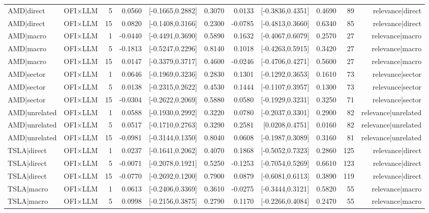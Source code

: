 \begin{table}[htbp]
\begin{tabular}{lrrrrrrrrrr}
AMD|direct & OFI×LLM & 5 & 0.0560 & [-0.1665,0.2882] & 0.3070 & 0.0133 & [-0.3836,0.4351] & 0.4690 & 89 & relevance|direct \\
AMD|direct & OFI×LLM & 15 & 0.0820 & [-0.1408,0.3166] & 0.2300 & -0.0785 & [-0.4813,0.3660] & 0.6340 & 85 & relevance|direct \\
AMD|macro & OFI×LLM & 1 & -0.0440 & [-0.4491,0.3690] & 0.5890 & 0.1632 & [-0.4067,0.6079] & 0.2570 & 27 & relevance|macro \\
AMD|macro & OFI×LLM & 5 & -0.1813 & [-0.5247,0.2296] & 0.8140 & 0.1018 & [-0.4263,0.5915] & 0.3420 & 27 & relevance|macro \\
AMD|macro & OFI×LLM & 15 & 0.0147 & [-0.3379,0.3717] & 0.4600 & -0.0246 & [-0.4706,0.4271] & 0.5600 & 27 & relevance|macro \\
AMD|sector & OFI×LLM & 1 & 0.0646 & [-0.1969,0.3236] & 0.2830 & 0.1301 & [-0.1292,0.3653] & 0.1610 & 73 & relevance|sector \\
AMD|sector & OFI×LLM & 5 & 0.0138 & [-0.2315,0.2622] & 0.4530 & 0.1444 & [-0.1107,0.3957] & 0.1300 & 73 & relevance|sector \\
AMD|sector & OFI×LLM & 15 & -0.0304 & [-0.2622,0.2069] & 0.5880 & 0.0580 & [-0.1929,0.3231] & 0.3250 & 71 & relevance|sector \\
AMD|unrelated & OFI×LLM & 1 & 0.0588 & [-0.1930,0.2992] & 0.3220 & 0.0780 & [-0.2037,0.3301] & 0.2900 & 82 & relevance|unrelated \\
AMD|unrelated & OFI×LLM & 5 & 0.0517 & [-0.1710,0.2763] & 0.3290 & 0.2581 & [0.0208,0.4751] & 0.0160 & 82 & relevance|unrelated \\
AMD|unrelated & OFI×LLM & 15 & -0.0981 & [-0.3144,0.1350] & 0.8040 & 0.0608 & [-0.1987,0.3089] & 0.3160 & 81 & relevance|unrelated \\
TSLA|direct & OFI×LLM & 1 & 0.0237 & [-0.1641,0.2062] & 0.4070 & 0.1868 & [-0.5052,0.7323] & 0.2860 & 125 & relevance|direct \\
TSLA|direct & OFI×LLM & 5 & -0.0071 & [-0.2078,0.1921] & 0.5250 & -0.1253 & [-0.7054,0.5269] & 0.6610 & 123 & relevance|direct \\
TSLA|direct & OFI×LLM & 15 & -0.0770 & [-0.2692,0.1200] & 0.7900 & 0.0879 & [-0.6081,0.6113] & 0.3890 & 119 & relevance|direct \\
TSLA|macro & OFI×LLM & 1 & 0.0613 & [-0.2406,0.3369] & 0.3610 & -0.0275 & [-0.3444,0.3121] & 0.5820 & 55 & relevance|macro \\
TSLA|macro & OFI×LLM & 5 & 0.0998 & [-0.2156,0.3875] & 0.2790 & 0.1170 & [-0.2266,0.4084] & 0.2470 & 55 & relevance|macro \\

\end{tabular}
\end{table}
